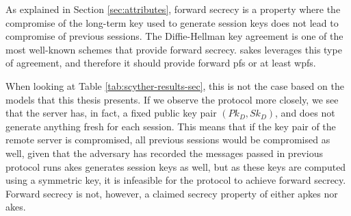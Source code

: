 \begin{table}[h]
\centering
{}
\caption[Table of the security properties for secrecy that are satisfied in the different protocols.]{Table of the security properties for secrecy that are satisfied in the different protocols. \checkmark indicates that that the property is verified, $\times$ that the property is falsified, and $-$ that the property is inapplicable for the protocol.}
\label{tab:scyther-results-sec}
\end{table}

As explained in Section \ref{sec:attributes}, forward secrecy is a property where the compromise of the long-term key used to generate session keys does not lead to compromise of previous sessions. The Diffie-Hellman key agreement is one of the most well-known schemes that provide forward secrecy. \gls{sakes} leverages this type of agreement, and therefore it should provide forward \gls{pfs} or at least \gls{wpfs}.

When looking at Table \ref{tab:scyther-results-sec}, this is not the case based on the models that this thesis presents. If we observe the protocol more closely, we see that the server has, in fact, a fixed public key pair $(Pk_D, Sk_D)$, and does not generate anything fresh for each session. This means that if the key pair of the remote server is compromised, all previous sessions would be compromised as well, given that the adversary has recorded the messages passed in previous protocol runs \gls{akes} generates session keys as well, but as these keys are computed using a symmetric key, it is infeasible for the protocol to achieve forward secrecy. Forward secrecy is not, however, a claimed secrecy property of either \gls{apkes} nor \gls{akes}.


